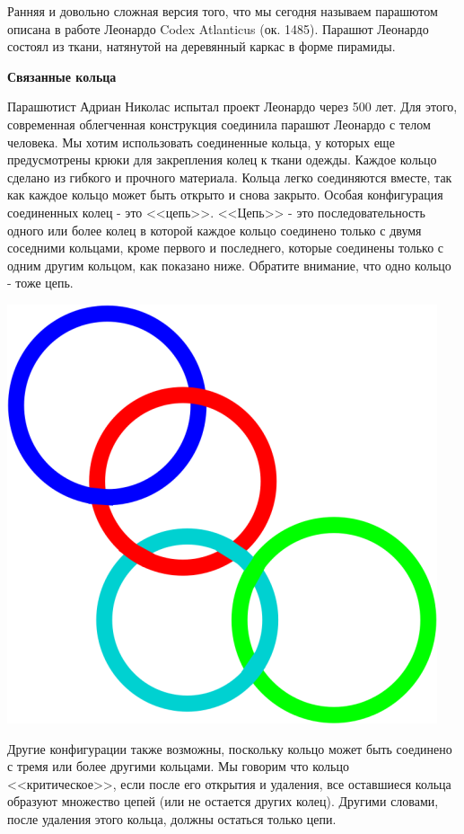 Ранняя и довольно сложная версия того, что мы сегодня называем парашютом описана в работе Леонардо Codex Atlanticus (ок. 1485). Парашют Леонардо состоял из ткани, натянутой на деревянный каркас в форме пирамиды.

\bf{Связанные кольца}

Парашютист Адриан Николас испытал проект Леонардо через 500 лет. Для этого, современная облегченная конструкция соединила парашют Леонардо с телом человека. Мы хотим использовать соединенные кольца, у которых еще предусмотрены крюки для закрепления колец к ткани одежды. Каждое кольцо сделано из гибкого и прочного материала. Кольца легко соединяются вместе, так как каждое кольцо может быть открыто и снова закрыто. Особая конфигурация соединенных колец - это <<цепь>>. <<Цепь>> - это последовательность одного или более колец в которой каждое кольцо соединено только с двумя соседними кольцами, кроме первого и последнего, которые соединены только с одним другим кольцом, как показано ниже. Обратите внимание, что одно кольцо - тоже цепь.

\includegraphics{image_000.png}

Другие конфигурации также возможны, поскольку кольцо может быть соединено с тремя или более другими кольцами. Мы говорим что кольцо <<критическое>>, если после его открытия и удаления, все оставшиеся кольца образуют множество цепей (или не остается других колец). Другими словами, после удаления этого кольца, должны остаться только цепи.

